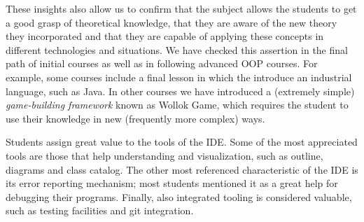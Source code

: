 
These insights also allow us to confirm that the subject allows the students to get a good grasp of theoretical knowledge, 
that they are aware of the new theory they incorporated
and that they are capable of applying these concepts in different technologies and situations.
We have checked this assertion in the final path of initial courses as well as in following advanced OOP courses.
For example, some courses include a final lesson in which the introduce an industrial language, such as Java.
In other courses we have introduced a (extremely simple) \emph{game-building framework} known as Wollok Game,
which requires the student to use their knowledge in new (frequently more complex) ways.

Students assign great value to the tools of the IDE.
Some of the most appreciated tools are those that help understanding and visualization, 
such as outline, diagrams and class catalog.
The other most referenced characteristic of the IDE is its error reporting mechanism;
most students mentioned it as a great help for debugging their programs.
Finally, also integrated tooling is considered valuable, 
such as testing facilities and git integration.




